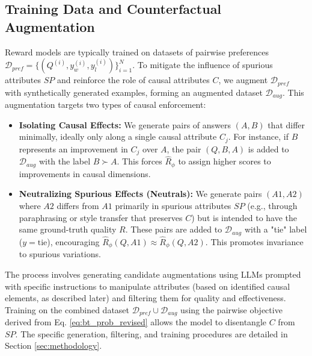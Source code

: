 \subsection{Training Data and Counterfactual Augmentation}
\label{subsec:data_augmentation}

Reward models are typically trained on datasets of pairwise preferences $\mathcal{D}_{pref} = \{(Q^{(i)}, y_w^{(i)}, y_l^{(i)})\}_{i=1}^N$. To mitigate the influence of spurious attributes $SP$ and reinforce the role of causal attributes $C$, we augment $\mathcal{D}_{pref}$ with synthetically generated examples, forming an augmented dataset $\mathcal{D}_{aug}$. This augmentation targets two types of causal enforcement:

\begin{itemize}[itemsep=0pt,left=2pt]
    \item \textbf{Isolating Causal Effects:} We generate pairs of answers $(A, B)$ that differ minimally, ideally only along a single causal attribute $C_j$. For instance, if $B$ represents an improvement in $C_j$ over $A$, the pair $(Q, B, A)$ is added to $\mathcal{D}_{aug}$ with the label $B \succ A$. This forces $\hat{R}_\phi$ to assign higher scores to improvements in causal dimensions.
    \item \textbf{Neutralizing Spurious Effects (Neutrals):} We generate pairs $(A1, A2)$ where $A2$ differs from $A1$ primarily in spurious attributes $SP$ (e.g., through paraphrasing or style transfer that preserves $C$) but is intended to have the same ground-truth quality $R$. These pairs are added to $\mathcal{D}_{aug}$ with a "tie" label ($y=\text{tie}$), encouraging $\hat{R}_\phi(Q, A1) \approx \hat{R}_\phi(Q, A2)$. This promotes invariance to spurious variations.
\end{itemize}
The process involves generating candidate augmentations using LLMs prompted with specific instructions to manipulate attributes (based on identified causal elements, as described later) and filtering them for quality and effectiveness. Training on the combined dataset $\mathcal{D}_{pref} \cup \mathcal{D}_{aug}$ using the pairwise objective derived from Eq. \ref{eq:bt_prob_revised} allows the model to disentangle $C$ from $SP$. The specific generation, filtering, and training procedures are detailed in Section \ref{sec:methodology}. %


